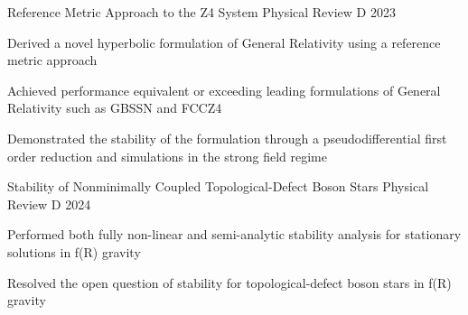 \begin{cventries}
    \cventrythree
    {Reference Metric Approach to the Z4 System} %
    {} %
    {Physical Review D} %
    {2023} %
    {\begin{cvitems} %
        \item Derived a novel hyperbolic formulation of General Relativity using a reference metric approach
        \item Achieved performance equivalent or exceeding leading formulations of General Relativity such as GBSSN and FCCZ4
        \item Demonstrated the stability of the formulation through a pseudodifferential first order reduction and simulations in the strong field regime
    \end{cvitems}}
    
    \cventrythree
    {Stability of Nonminimally Coupled Topological-Defect Boson Stars} %
    {} %
    {Physical Review D} %
    {2024} %
    {\begin{cvitems} %
        \item Performed both fully non-linear and semi-analytic stability analysis for stationary solutions in f(R) gravity
        \item Resolved the open question of stability for topological-defect boson stars in f(R) gravity
    \end{cvitems}}
    

\end{cventries}